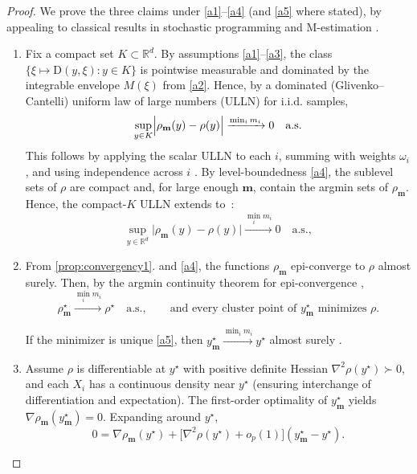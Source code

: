 \documentclass[letter,11pt, reqno]{amsart}
\newcommand{\R}{\mathbb{R}}
\newcommand{\D}{\mathrm{D}}
\renewcommand{\;}{\quad}
\theoremstyle{thmstyleone}%
\theoremstyle{thmstyletwo}%
\theoremstyle{thmstylethree}%
\begin{document}
\begin{proof}
We prove the three claims under \ref{a1}--\ref{a4} (and \ref{a5} where stated), by appealing to classical results in stochastic programming and M-estimation
\citep{ShapiroDentchevaRuszczynski2014,RockafellarWets1998}.
\begin{enumerate}
\item Fix a compact set $K\subset\R^d$. 
By assumptions \ref{a1}--\ref{a3}, the class 
$\{\xi \mapsto \D(y,\xi) : y\in K\}$ is pointwise measurable and dominated by the integrable envelope $M(\xi)$ from \ref{a2}. 
Hence, by a dominated (Glivenko–Cantelli) uniform law of large numbers (ULLN) for i.i.d. samples,
\begin{equation*}
    \sup_{y\in K}\Bigl|\rho_{\mathbf m}(y)-\rho(y)\Bigr|\xrightarrow{\min_i m_i}0 \quad \text{a.s.}
\end{equation*}
This follows by applying the scalar ULLN to each $i$, summing with weights $\omega_i$, and using independence across $i$ 
\citep[Th.~5.3]{ShapiroDentchevaRuszczynski2014}.
By level-boundedness \ref{a4}, the sublevel sets of $\rho$ are compact and, for large enough $\mathbf m$, contain the argmin sets of $\rho_{\mathbf m}$. 
Hence, the compact-$K$ ULLN extends to~\citep[see, e.g.][]{RockafellarWets1998}:
\begin{equation*}
    \sup_{y\in\R^d}\big|\rho_{\mathbf m}(y)-\rho(y)\big| \xrightarrow{\min_i m_i} 0 \quad \text{a.s.},
\end{equation*}
\item From \ref{prop:convergency1}. and \ref{a4}, the functions $\rho_{\mathbf m}$ epi-converge to $\rho$ almost surely.
Then, by the argmin continuity theorem for epi-convergence
\citep{RockafellarWets1998},
\begin{equation*}
    \rho_{\mathbf m}^\star\xrightarrow{\min_i m_i} \rho^\star \quad \text{a.s.}, 
\qquad
\text{and every cluster point of } y^\star_{\mathbf m} \text{ minimizes } \rho.
\end{equation*}

If the minimizer is unique \ref{a5}, then $y^\star_{\mathbf m}\xrightarrow{\min_i m_i} y^\star$ almost surely
\citep[Th.~5.4]{ShapiroDentchevaRuszczynski2014}.
\item Assume $\rho$ is differentiable at $y^\star$ with positive definite Hessian $\nabla^2\rho(y^\star)\succ0$, 
and each $X_i$ has a continuous density near $y^\star$ (ensuring interchange of differentiation and expectation).
The first-order optimality of $y^\star_{\mathbf m}$ yields $\nabla\rho_{\mathbf m}(y^\star_{\mathbf m})=0$.
Expanding around $y^\star$,
\begin{equation*}
    0 = \nabla\rho_{\mathbf m}(y^\star) 
      + \bigl[\nabla^2\rho(y^\star)+o_p(1)\bigr](y^\star_{\mathbf m}-y^\star).
\end{equation*}


\end{enumerate}
\end{proof}
\end{document}
